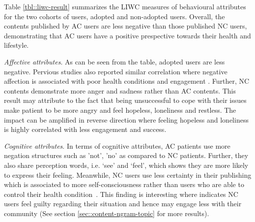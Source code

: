\documentclass{acm_proc_article-sp}
\begin{document}
Table \ref{tbl::liwc-result} summarizes the LIWC measures of behavioural attributes for the two cohorts of users, adopted and non-adopted users.  Overall, the contents published by AC users are less negative than those published NC users, demonstrating that AC users have a positive prespective towards their health and lifestyle.

\emph{Affective attributes}.  As can be seen from the table, adopted users are less negative. Pervious studies also reported similar correlation where negative affection is associated with poor health conditions and engagement \cite{schwartz2016predicting}. Further, NC contents demonstrate more anger and sadness rather than AC contents. This result may attribute to the fact that being unsuccessful to cope with their issues make patient to be more angry and feel hopeless, loneliness and restless. The impact can be amplified in reverse direction where feeling hopeless and loneliness is highly correlated with less engagement and success.

\emph{Cognitive attributes}.  In terms of cognitive attributes, AC patients use more negation structures such as 'not', 'no' as compared to NC patients. Further, they also share perception words, i.e. `see' and `feel', which shows they are more likely to express their feeling. Meanwhile, NC users use less certainty in their publishing which is associated to more self-consciousness rather than users who are able to control their health condition~\cite{taylor1988illusion}. This finding is interesting where indicates NC users feel guilty regarding their situation and hence may engage less with their community (See section \ref{sec::content-ngram-topic} for more results).
\end{document}
